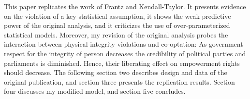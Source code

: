 This paper replicates the work of Frantz and Kendall-Taylor.
It presents evidence on the violation of a key statistical 
assumption, it shows the weak predictive power of the 
original analysis, and it criticizes the use of 
over-parameterized statistical models. Moreover, my revision
of the original analysis probes the interaction between 
physical integrity violations and co-optation: As government 
respect for the integrity of person decreases the 
credibility of political parties and parliaments is 
diminished. Hence, their liberating effect on empowerment 
rights should decrease. The following section two describes 
design and data of the original publication, and section 
three presents the replication results. Section four 
discusses my modified model, and section five concludes.